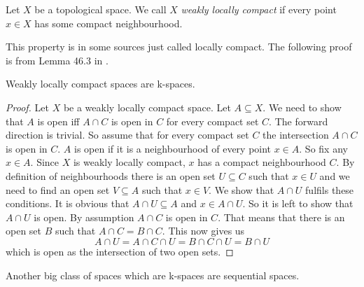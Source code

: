 \begin{defi}
    Let $X$ be a topological space.
    We call $X$ \emph{weakly locally compact} if every point $x \in X$ has some compact neighbourhood.
    \href{https://github.com/leanprover-community/mathlib4/blob/93828f4cd10fb8cab31700b110fd2751d36bf1b8/Mathlib/Topology/Defs/Filter.lean#L270-L274}{\faExternalLink}
\end{defi}

This property is in some sources just called locally compact.
The following proof is from Lemma 46.3 in \cite{Munkres2014}.

\begin{lem} \label{lem:weaklylocallycompactiskspace}
    Weakly locally compact spaces are k-spaces.
    \href{https://github.com/scholzhannah/CWComplexes/blob/7be4872a05b534011cc969eb5b80a4b7f0bf57e2/CWcomplexes/KSpace.lean#L69-L86}{\faExternalLink}
\end{lem}
\begin{proof}
    Let $X$ be a weakly locally compact space. 
    Let $A \subseteq X$.
    We need to show that $A$ is open iff $A \cap C$ is open in $C$ for every compact set $C$.
    The forward direction is trivial. 
    So assume that for every compact set $C$ the intersection $A \cap C$ is open in $C$.
    $A$ is open if it is a neighbourhood of every point $x \in A$.
    So fix any $x \in A$.
    Since $X$ is weakly locally compact, $x$ has a compact neighbourhood $C$.
    By definition of neighbourhoods there is an open set $U \subseteq C$ such that $x \in U$ and we need to find an open set $V \subseteq A$ such that $x \in V$.
    We show that $A \cap U$ fulfils these conditions. 
    It is obvious that $A \cap U \subseteq A$ and $x \in A \cap U$. 
    So it is left to show that $A \cap U$ is open.
    By assumption $A \cap C$ is open in $C$. 
    That means that there is an open set $B$ such that $A \cap C = B \cap C$. 
    This now gives us 
    \[A \cap U = A \cap C \cap U = B \cap C \cap U = B \cap U\]
    which is open as the intersection of two open sets. 
\end{proof}

Another big class of spaces which are k-spaces are sequential spaces. 

